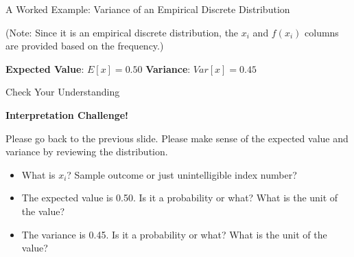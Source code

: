 \documentclass{beamer}
\begin{document}
\begin{frame}{A Worked Example: Variance of an Empirical Discrete Distribution}

(Note: Since it is an empirical discrete distribution, the $x_i$ and $f(x_i)$ columns are provided based on the frequency.)

\begin{table}[]
\end{table}

\textbf{Expected Value}:  $E[x] = 0.50$ \hspace{0.5 cm}   \textbf{Variance}: $Var[x] = 0.45$

\end{frame}


\begin{frame}{Check Your Understanding}

\textbf{Interpretation Challenge!}

\vspace{0.3 cm}
Please go back to the previous slide. Please make sense of the expected value and variance by reviewing the distribution. 
\begin{itemize}
\item What is $x_i$? Sample outcome or just unintelligible index number? 
\item The expected value is 0.50. Is it a probability or what? What is the unit of the value? 
\item The variance is 0.45. Is it a probability or what? What is the unit of the value? 
\end{itemize}

\end{frame}
\end{document}
